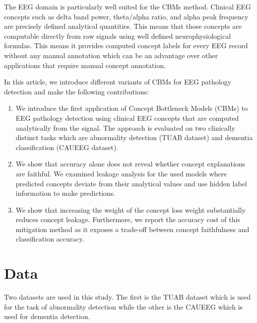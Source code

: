 \documentclass[journal,twoside,web]{ieeecolor}
\begin{document}
The EEG domain is particularly well suited for the CBMs method. Clinical EEG concepts such as delta band power, theta/alpha ratio, and alpha peak frequency are precisely defined analytical quantities. This means that those concepts are computable directly from raw signals using well defined neurophysiological formulas. This means it provides computed concept labels for every EEG record without any manual annotation which can be an advantage over other applications that require manual concept annotation. 

In this article, we introduce different variants of CBMs for EEG pathology detection and make the following contributions:


\begin{enumerate}

\item We introduce the first application of Concept Bottleneck Models (CBMs) to EEG pathology detection using clinical EEG concepts that are computed analytically from the signal. The approach is evaluated on two clinically distinct tasks which are abnormality detection (TUAB dataset) and dementia classification (CAUEEG dataset).

\item We show that accuracy alone does not reveal whether concept explanations are faithful. We examined leakage analysis for the used models where predicted concepts deviate from their analytical values and use hidden label information to make predictions. 

\item We show that increasing the weight of the concept loss weight substantially reduces concept leakage. Furthermore, we report the accuracy cost of this mitigation method as it exposes a trade-off between concept faithfulness and classification accuracy.

\end{enumerate}



\section{Data}
\label{sec:dataset}
Two datasets are used in this study. The first is the TUAB dataset which is used for the task of abnormality detection while the other is the CAUEEG which is used for dementia detection. 
\end{document}
